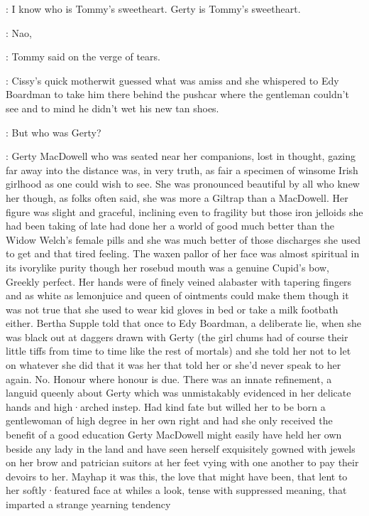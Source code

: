 \edy:
I know who is Tommy's sweetheart.
Gerty is Tommy's sweetheart.

\tommy:
Nao,

:
Tommy said
on the verge of tears.

:
Cissy's quick motherwit
guessed what was amiss
and she whispered to Edy Boardman
to take him there
behind the pushcar
where the gentleman couldn't see
and to mind
he didn't wet his new tan shoes.

:
But who was Gerty?

:
Gerty MacDowell
who was seated near her companions,
lost in thought,
gazing far away into the distance
was,
in very truth,
as fair a specimen
of winsome Irish girlhood
as one could wish to see.
She was pronounced beautiful
by all who knew her
though,
as folks often said,
she was more a Giltrap than a MacDowell.
Her figure was slight and graceful,
inclining even to fragility
but those iron jelloids
she had been taking of late
had done her a world of good
much better than the Widow Welch's female pills
and she was much better
of those discharges she used to get
and that tired feeling.
The waxen pallor of her face
was almost spiritual
in its ivorylike purity
though her rosebud mouth was a genuine Cupid's bow,
Greekly perfect.
Her hands were of finely veined alabaster
with tapering fingers
and
as white as lemonjuice
and queen of ointments
could make them
though it was not true
that she used to wear kid gloves in bed
or take a milk footbath either.
Bertha Supple told that once
to Edy Boardman,
a deliberate lie,
when she was black out
at daggers drawn with Gerty
(the girl chums had
of course
their little tiffs
from time to time
like the rest of mortals)
and she told her
not to let on
whatever she did that
it was her that told her
or she'd never speak to her again.
No.
Honour where honour is due.
There was an innate refinement,
a languid queenly  about Gerty
which was unmistakably evidenced
in her delicate hands
and high·arched instep.
Had kind fate
but willed her
to be born a gentlewoman of high degree
in her own right
and had she only received the benefit of a good education
Gerty MacDowell might easily have held her own
beside any lady in the land
and have seen herself exquisitely gowned
with jewels on her brow
and patrician suitors at her feet
vying with one another to pay their devoirs to her.
Mayhap it was this,
the love that might have been,
that lent to her softly·featured face at whiles
a look,
tense with suppressed meaning,
that imparted a strange yearning tendency
